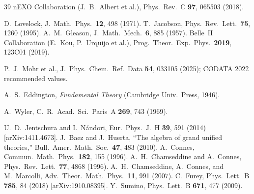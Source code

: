 \documentclass[12pt,a4paper]{article}
\begin{document}
\begin{thebibliography}{39}
 nEXO Collaboration (J.~B.~Albert et al.),
  Phys.\ Rev.\ C \textbf{97}, 065503 (2018).

 D.~Lovelock, J.\ Math.\ Phys.\ \textbf{12}, 498 (1971).
 T.~Jacobson, Phys.\ Rev.\ Lett.\ \textbf{75}, 1260 (1995).
 A.~M.~Gleason, J.\ Math.\ Mech.\ \textbf{6}, 885 (1957).
 Belle~II Collaboration (E.~Kou, P.~Urquijo et al.),
  Prog.\ Theor.\ Exp.\ Phys.\ \textbf{2019}, 123C01 (2019).



 P.~J.~Mohr et al.,
  J.\ Phys.\ Chem.\ Ref.\ Data \textbf{54}, 033105 (2025);
  CODATA 2022 recommended values.

 A.~S.~Eddington,
  \textit{Fundamental Theory} (Cambridge Univ.\ Press, 1946).

 A.~Wyler,
  C.\ R.\ Acad.\ Sci.\ Paris~A \textbf{269}, 743 (1969).

 U.~D.~Jentschura and I.~N\'andori,
  Eur.\ Phys.\ J.~H \textbf{39}, 591 (2014)
  [arXiv:1411.4673].
 J.~Baez and J.~Huerta, ``The algebra of grand
  unified theories,'' Bull.\ Amer.\ Math.\ Soc.\ \textbf{47}, 483 (2010).
 A.~Connes, Commun.\ Math.\ Phys.\ \textbf{182}, 155 (1996).
 A.~H.~Chamseddine and A.~Connes, Phys.\ Rev.\ Lett.\ \textbf{77}, 4868 (1996).
 A.~H.~Chamseddine, A.~Connes, and M.~Marcolli, Adv.\ Theor.\ Math.\ Phys.\ \textbf{11}, 991 (2007).
 C.~Furey, Phys.\ Lett.\ B \textbf{785}, 84 (2018) [arXiv:1910.08395].
 Y.~Sumino, Phys.\ Lett.\ B \textbf{671}, 477 (2009).

\end{thebibliography}
\end{document}
